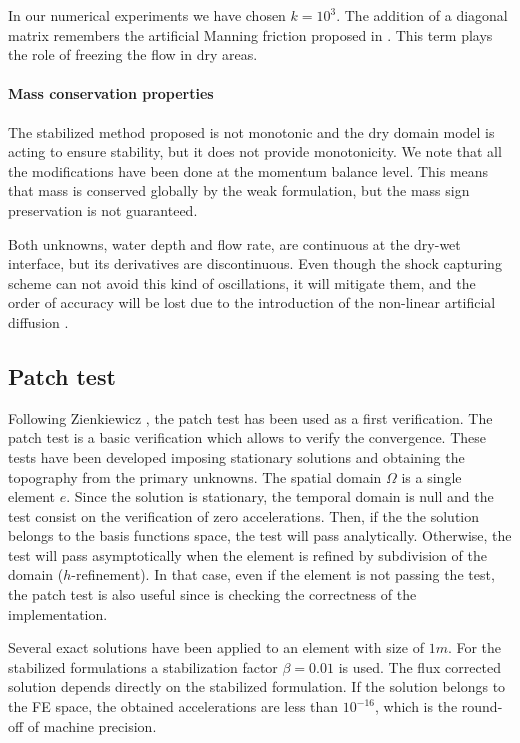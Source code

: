 In our numerical experiments we have chosen $k=10^3$.
The addition of a diagonal matrix remembers the artificial Manning friction proposed in \cite{heniche2000}. This term plays the role of freezing the flow in dry areas.


\paragraph{Mass conservation properties}
The stabilized method proposed is not monotonic and the dry domain model is acting to ensure stability, but it does not provide monotonicity. We note that all the modifications have been done at the momentum balance level. This means that mass is conserved globally by the weak formulation, but the mass sign preservation is not guaranteed.

Both unknowns, water depth and flow rate, are continuous at the dry-wet interface, but its derivatives are discontinuous. Even though the shock capturing scheme can not avoid this kind of oscillations, it will mitigate them, and the order of accuracy will be lost due to the introduction of the non-linear artificial diffusion \cite{badia2014}.






\subsection{Patch test}


Following Zienkiewicz \cite{zien1}, the patch test has been used as a first verification. The patch test is a basic verification which allows to verify the convergence. These tests have been developed imposing stationary solutions and obtaining the topography from the primary unknowns. The spatial domain $\Omega$ is a single element $e$.
Since the solution is stationary, the temporal domain is null and the test consist on the verification of zero accelerations.
Then, if the the solution belongs to the basis functions space, the test will pass analytically.
Otherwise, the test will pass asymptotically when the element is refined by subdivision of the domain ($h$-refinement). In that case, even if the element is not passing the test, the patch test is also useful since is checking the correctness of the implementation.

Several exact solutions have been applied to an element with size of $1m$. For the stabilized formulations a stabilization factor $\beta=0.01$ is used. The flux corrected solution depends directly on the stabilized formulation. If the solution belongs to the FE space, the obtained accelerations are less than $10^{-16}$, which is the round-off of machine precision.

